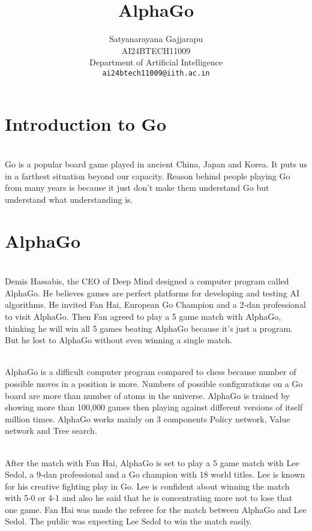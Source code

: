 \documentclass{article}
\title{AlphaGo}
\author{%
Satyanarayana Gajjarapu \\
AI24BTECH11009 \\
Department of Artificial Intelligence \\
\texttt{ai24btech11009@iith.ac.in} \\
}
\begin{document}
\maketitle
\section{Introduction to Go}
\begin{paragraph}
\\ 
Go is a popular board game played in ancient China, Japan and Korea. It puts us in a farthest situation beyond our capacity. Reason behind people playing Go from many years is because it just don't make them understand Go but understand what understanding is. 
\end{paragraph}
\section{AlphaGo}
\begin{paragraph}
\\ 
Demis Hassabis, the CEO of Deep Mind designed a computer program called AlphaGo. He believes games are perfect platforms for developing and testing AI algorithms. He invited Fan Hai, European Go Champion and a 2-dan professional to visit AlphaGo. Then Fan agreed to play a 5 game match with AlphaGo, thinking he will win all 5 games beating AlphaGo because it's just a program. But he lost to AlphaGo without even winning a single match.
\end{paragraph}

\begin{paragraph}
\\
AlphaGo is a difficult computer program compared to chess because number of possible moves in a position is more. Numbers of possible configurations on a Go board are more than number of atoms in the universe. AlphaGo is trained by showing more than 100,000 games then playing against different versions of itself million times. AlphaGo works mainly on 3 components Policy network, Value network and Tree search.
\end{paragraph}
\begin{paragraph}
\\
After the match with Fan Hai, AlphaGo is set to play a 5 game match with Lee Sedol, a 9-dan professional and a Go champion with 18 world titles. Lee is known for his creative fighting play in Go. Lee is confident about winning the match with 5-0 or 4-1 and also he said that he is concentrating more not to lose that one game. Fan Hai was made the referee for the match between AlphaGo and Lee Sedol. The public was expecting Lee Sedol to win the match easily.
\end{paragraph}
\end{document}
